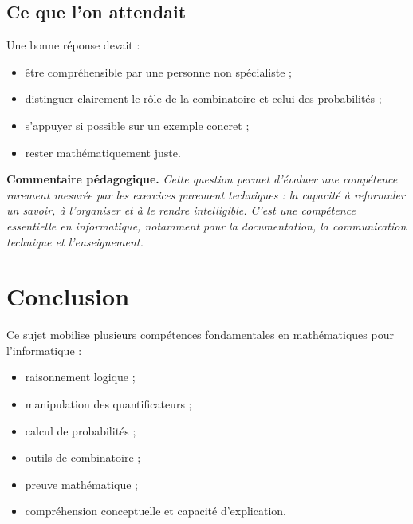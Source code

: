 \documentclass[12pt,a4paper]{article}
\newenvironment{pedago}
{\par\smallskip\noindent\textbf{Commentaire pédagogique. }\itshape}
{\par\smallskip}
\begin{document}
\subsection*{Ce que l'on attendait}

Une bonne réponse devait :
\begin{itemize}[leftmargin=1.2cm]
    \item être compréhensible par une personne non spécialiste ;
    \item distinguer clairement le rôle de la combinatoire et celui des probabilités ;
    \item s'appuyer si possible sur un exemple concret ;
    \item rester mathématiquement juste.
\end{itemize}

\begin{pedago}
Cette question permet d'évaluer une compétence rarement mesurée par les exercices purement techniques : la capacité à reformuler un savoir, à l'organiser et à le rendre intelligible. C'est une compétence essentielle en informatique, notamment pour la documentation, la communication technique et l'enseignement.
\end{pedago}

\bigskip

\section*{Conclusion}

Ce sujet mobilise plusieurs compétences fondamentales en mathématiques pour l'informatique :
\begin{itemize}[leftmargin=1.2cm]
    \item raisonnement logique ;
    \item manipulation des quantificateurs ;
    \item calcul de probabilités ;
    \item outils de combinatoire ;
    \item preuve mathématique ;
    \item compréhension conceptuelle et capacité d'explication.
\end{itemize}
\end{document}
